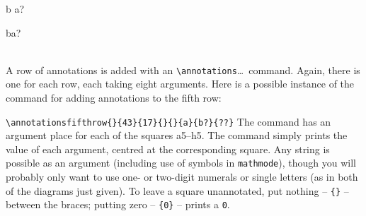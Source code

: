\documentclass[a4paper,12pt]{article}
\begin{document}
\noindent \begin{minipage}[t]{212pt}
\vspace{0pt}
\begin{othelloboard}{1}
\dotmarkings
{}
\annotationssecondrow	{}	{}	{}	{}	{}	{}	{}	{}
\annotationsthirdrow		{}	{}	{}	{}	{}	{}	{}	{}
\annotationsfourthrow	{}	{}	{}	{}	{}	{}	{}	{}
	{}	{}	{}	{}	{}	{}	{}
\annotationssixthrow		{}	{}	{}	{}	{}	{}	{}	{}
\annotationsseventhrow	{}	{}	{}	{b}	{a?}	{}	{}	{}
\end{othelloboard}
\end{minipage}
\begin{minipage}[t]{248pt}
\vspace{8pt}
\begin{footnotesize}
\begin{verbatimtab}
\begin{othelloboard}{1}
\dotmarkings
{}
\annotationssecondrow	{} {} {} {} {} {} {} {}
\annotationsthirdrow	{} {} {} {} {} {} {} {}
\annotationsfourthrow	{} {} {} {} {} {} {} {}
 {} {} {} {} {} {}
\annotationssixthrow	{} {} {} {} {} {} {} {}
\annotationsseventhrow	{} {} {}{b}{a?}{} {} {}
\end{othelloboard}
\end{verbatimtab}
\end{footnotesize}
\end{minipage}
\ \\

A row of annotations is added with an \verb=\annotations=\ldots\ command. Again, there is one for each row, each taking eight arguments. Here is a possible instance of the command for adding annotations to the fifth row:

\begin{description}
\item{\verb=\annotationsfifthrow{}{43}{17}{}{}{a}{b?}{??}=} The command has an argument place for each of the squares a5--h5. The command simply prints the value of each argument, centred at the corresponding square. Any string is possible as an argument (including use of symbols in \verb=mathmode=), though you will probably only want to use one- or two-digit numerals or single letters (as in both of the diagrams just given). To leave a square unannotated, put nothing -- \verb={}= -- between the braces; putting zero -- \verb={0}= -- prints a \verb=0=.
\end{description}
\end{document}
